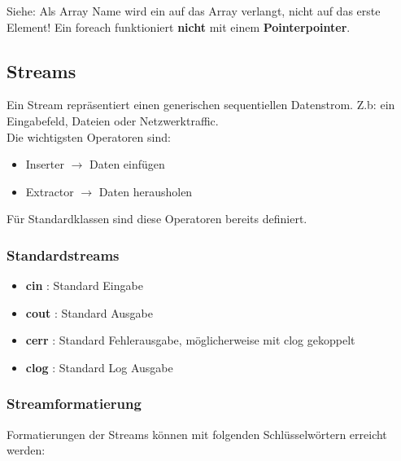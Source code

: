 

Siehe: Als Array Name wird ein  auf das Array verlangt, nicht auf das erste Element!  
Ein foreach funktioniert \textbf{nicht} mit einem \textbf{Pointerpointer}. 

\subsection{Streams}

Ein Stream repräsentiert einen generischen sequentiellen Datenstrom. Z.b: ein Eingabefeld, Dateien oder Netzwerktraffic.\\
Die wichtigsten Operatoren sind:

\begin{itemize}[itemsep=1pt, parsep=0pt]
    \item \say{$<<$} Inserter $\rightarrow$  Daten einfügen
    \item \say{$>>$} Extractor $\rightarrow$ Daten herausholen
\end{itemize}

Für Standardklassen sind diese Operatoren bereits definiert.

\subsubsection{Standardstreams}

\begin{itemize}[itemsep=1pt, parsep=0pt]
    \item \textbf{cin} : Standard Eingabe
    \item \textbf{cout} : Standard Ausgabe
    \item \textbf{cerr} : Standard Fehlerausgabe, möglicherweise mit clog gekoppelt 
    \item \textbf{clog} : Standard Log Ausgabe 
\end{itemize}

\subsubsection{Streamformatierung}

Formatierungen der Streams können mit folgenden Schlüsselwörtern erreicht werden:


